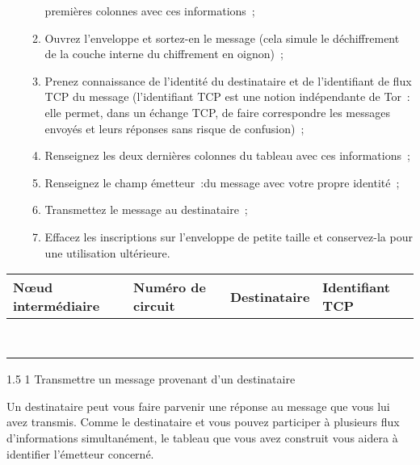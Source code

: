 \documentclass[a4paper,twoside,french]{article}
\makeatletter
\renewcommand\section{\@startsection
  {section}{1}{1cm}%
  {1.5\baselineskip}%
  {1\baselineskip}%
  {\normalfont\Large\bfseries}}%
\makeatother
\begin{document}
\begin{enumerate}
\begin{enumerate}
      premières colonnes avec ces informations~;
    \item Ouvrez l'enveloppe et sortez-en le message (cela simule le
      déchiffrement de la couche interne du chiffrement en oignon)~;
    \item Prenez connaissance de l'identité du destinataire et de
      l'identifiant de flux TCP du message (l'identifiant TCP est une
      notion indépendante de Tor~: elle permet, dans un échange TCP,
      de faire correspondre les messages envoyés et leurs réponses
      sans risque de confusion)~;
    \item Renseignez les deux dernières colonnes du tableau avec ces
      informations~;
    \item Renseignez le champ \og émetteur~:\fg du message avec votre
      propre identité~;
    \item Transmettez le message au destinataire~;
    \item Effacez les inscriptions sur l'enveloppe de petite taille et
      conservez-la pour une utilisation ultérieure.
    \end{enumerate}
  \end{enumerate}
  \begin{center}
    \begin{tabular}{|m{3cm}|m{3cm}|m{3cm}|m{3cm}|}
      \hline
      N\oe ud intermédiaire & Numéro de circuit &  Destinataire & Identifiant TCP \\
      \hline
      & & & \\
      & & & \\
      \hline
      & & & \\
      & & & \\
      \hline
      & & & \\
      & & & \\
      \hline
      & & & \\
      & & & \\
      \hline
    \end{tabular}
  \end{center}


  \section{Transmettre un message provenant d'un destinataire}

  Un destinataire peut vous faire parvenir une réponse au message que
  vous lui avez transmis. Comme le destinataire et vous pouvez
  participer à plusieurs flux d'informations simultanément, le tableau
  que vous avez construit vous aidera à identifier l'émetteur
  concerné.
\end{document}
